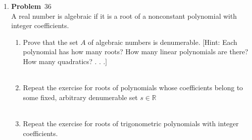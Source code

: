 \documentclass[12pt]{amsart}
\newcommand{\benu}{\begin{enumerate}}
\newcommand{\eenu}{\end{enumerate}}
\theoremstyle{definition}
\newcommand{\mbR}{\mathbb{R}}
\newcommand{\itep}{\item {\bfseries Problem}\ }
\begin{document}
\begin{enumerate}[series=p]
\newpage
\itep 36\\
A real number is algebraic if it is a root of a nonconstant polynomial with integer coefficients.
\benu
\item Prove that the set $A$ of algebraic numbers is denumerable.  [Hint: Each polynomial has how many roots?  How many linear polynomials are there?  How many quadratics? . . .]
\\
\\
\item Repeat the exercise for roots of polynomials whose coefficients belong to some fixed, arbitrary denumerable set $s \in \mbR$
\\
\\
\item Repeat the exercise for roots of trigonometric polynomials with integer coefficients.
\\
\\
\eenu

\end{enumerate}
\end{document}
